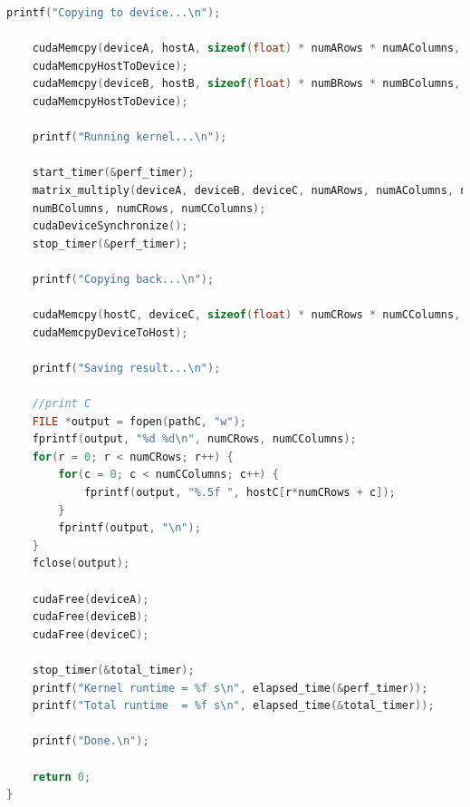 \documentclass[11pt,a4paper]{article}
\begin{document}
\begin{lstlisting}[language=c]
	printf("Copying to device...\n");
	
	cudaMemcpy(deviceA, hostA, sizeof(float) * numARows * numAColumns,
	cudaMemcpyHostToDevice);
	cudaMemcpy(deviceB, hostB, sizeof(float) * numBRows * numBColumns,
	cudaMemcpyHostToDevice);
	
	printf("Running kernel...\n");
	
	start_timer(&perf_timer);
	matrix_multiply(deviceA, deviceB, deviceC, numARows, numAColumns, numBRows,
	numBColumns, numCRows, numCColumns);
	cudaDeviceSynchronize();
	stop_timer(&perf_timer);
	
	printf("Copying back...\n");
	
	cudaMemcpy(hostC, deviceC, sizeof(float) * numCRows * numCColumns,
	cudaMemcpyDeviceToHost);
	
	printf("Saving result...\n");
	
	//print C
	FILE *output = fopen(pathC, "w");
	fprintf(output, "%d %d\n", numCRows, numCColumns);
	for(r = 0; r < numCRows; r++) {
		for(c = 0; c < numCColumns; c++) {
			fprintf(output, "%.5f ", hostC[r*numCRows + c]);
		}
		fprintf(output, "\n");
	}
	fclose(output);
	
	cudaFree(deviceA);
	cudaFree(deviceB);
	cudaFree(deviceC);
	
	stop_timer(&total_timer);
	printf("Kernel runtime = %f s\n", elapsed_time(&perf_timer));
	printf("Total runtime  = %f s\n", elapsed_time(&total_timer));
	
	printf("Done.\n");
	
	return 0;
}

\end{lstlisting}
	
\end{document}
